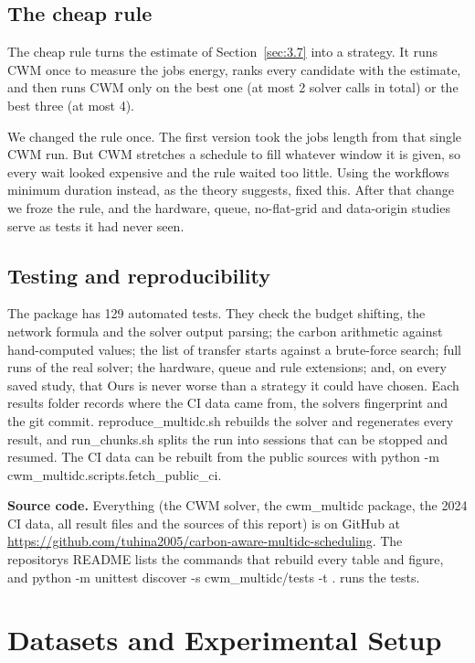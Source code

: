 \documentclass[12pt,a4paper,oneside,openany]{report}
\begin{document}
\section{The cheap rule}\label{sec:4.4}

The cheap rule turns the estimate of Section~\ref{sec:3.7} into a strategy. It
runs CWM once to measure the job\textquotesingle s energy, ranks every
candidate with the estimate, and then runs CWM only on the best one (at
most 2 solver calls in total) or the best three (at most 4).

We changed the rule once. The first version took the
job\textquotesingle s length from that single CWM run. But CWM stretches
a schedule to fill whatever window it is given, so every wait looked
expensive and the rule waited too little. Using the
workflow\textquotesingle s minimum duration instead, as the theory
suggests, fixed this. After that change we froze the rule, and the
hardware, queue, no-flat-grid and data-origin studies serve as tests it
had never seen.

\section{Testing and reproducibility}\label{sec:4.6}

The package has 129 automated tests. They check the budget shifting, the
network formula and the solver output parsing; the carbon arithmetic
against hand-computed values; the list of transfer starts against a
brute-force search; full runs of the real solver; the hardware, queue
and rule extensions; and, on every saved study, that Ours is never worse
than a strategy it could have chosen. Each results folder records where
the CI data came from, the solver\textquotesingle s fingerprint and the
git commit. reproduce\_multidc.sh rebuilds the solver and regenerates
every result, and run\_chunks.sh splits the run into sessions that can
be stopped and resumed. The CI data can be rebuilt from the public
sources with python -m cwm\_multidc.scripts.fetch\_public\_ci.

\textbf{Source code.} Everything (the CWM solver, the cwm\_multidc
package, the 2024 CI data, all result files and the sources of this
report) is on GitHub at
\url{https://github.com/tuhina2005/carbon-aware-multidc-scheduling}.
The repository\textquotesingle s README lists the commands that rebuild
every table and figure, and python -m unittest discover -s
cwm\_multidc/tests -t . runs the tests.

\chapter{Datasets and Experimental Setup}\label{ch:5}
\end{document}
